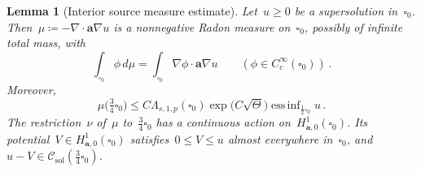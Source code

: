 \documentclass[11pt,letterpaper]{article}
\numberwithin{equation}{section}
\newtheorem{lemma}[theorem]{Lemma}
\theoremstyle{definition}
\renewcommand{\a}{\mathbf{a}}
\newcommand{\cu}{\square}
\DeclareMathOperator*{\essinf}{ess\,inf}
\newcommand{\Hzero}[1]{H^1_{#1,0}}
\newcommand{\Csol}{\mathcal C_{\mathrm{sol}}}
\begin{document}
\begin{lemma}[Interior source measure estimate]
\label{l.source.mass}
Let~$u\geq0$ be a supersolution in~$\cu_0$. Then~$\mu\coloneqq-\nabla\cdot\a\nabla u$ is a nonnegative Radon measure on~$\cu_0$, possibly of infinite total mass, with
\begin{equation*}
	\int_{\cu_0}\phi\,d\mu=\int_{\cu_0}\nabla\phi\cdot\a\nabla u\qquad(\phi\in C^\infty_c(\cu_0))\,.
\end{equation*}
Moreover,
\begin{equation}
	\mu\bigl(\tfrac34\cu_0\bigr)\leq C\Lambda_{s,1,p}(\cu_0)\exp\bigl(C\sqrt\Theta\bigr)\essinf_{\frac12\cu_0}u\,.
\label{e.source.mass}
\end{equation}
The restriction~$\nu$ of~$\mu$ to~$\frac34\cu_0$ has a continuous action on~$\Hzero{\a}(\cu_0)$. Its potential~$V\in\Hzero{\a}(\cu_0)$ satisfies~$0\leq V\leq u$ almost everywhere in~$\cu_0$, and~$u-V\in\Csol(\frac34\cu_0)$.
\end{lemma}
\end{document}
